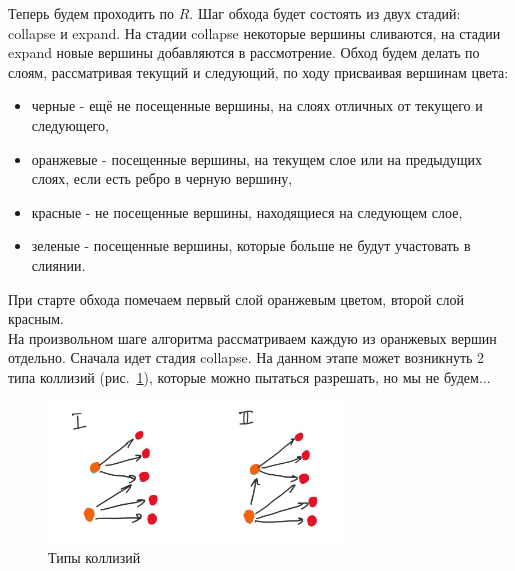 \begin{algo}
Теперь будем проходить по $R$. Шаг обхода будет состоять из двух стадий: collapse и expand. На стадии collapse некоторые вершины сливаются, на стадии expand новые вершины добавляются в рассмотрение. Обход будем делать по слоям, рассматривая текущий и следующий, по ходу присваивая вершинам цвета:\\
\begin{itemize}
    \item черные - ещё не посещенные вершины, на слоях отличных от текущего и следующего,
    \item оранжевые - посещенные вершины, на текущем слое или на предыдущих слоях, если есть ребро в черную вершину,
    \item красные - не посещенные вершины, находящиеся на следующем слое,
    \item зеленые - посещенные вершины, которые больше не будут участовать в слиянии.
\end{itemize}
При старте обхода помечаем первый слой оранжевым цветом, второй слой красным.\\
На произвольном шаге алгоритма рассматриваем каждую из оранжевых вершин отдельно. Сначала идет стадия collapse. На данном этапе может возникнуть 2 типа коллизий (рис.~\ref{fig:collision}), которые можно пытаться разрешать, но мы не будем...\\
\begin{figure}[h]
    \centering
    \includegraphics[width=0.7\textwidth]{img/collision.jpeg}
    \caption{Типы коллизий}
    \label{fig:collision}
\end{figure}


\end{algo}
